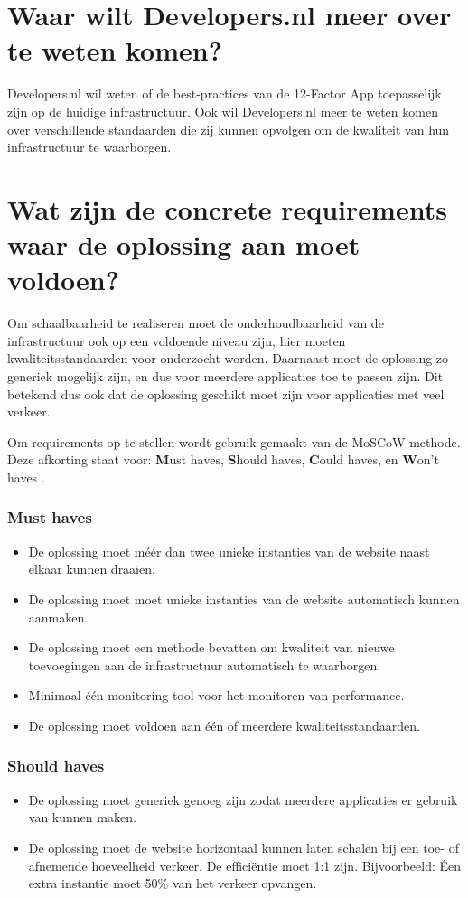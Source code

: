 \section{Waar wilt Developers.nl meer over te weten komen?}

Developers.nl wil weten of de best-practices van de 12-Factor App toepasselijk zijn op de huidige infrastructuur. Ook wil Developers.nl meer te weten komen over verschillende standaarden die zij kunnen opvolgen om de kwaliteit van hun infrastructuur te waarborgen.

\section{Wat zijn de concrete requirements waar de oplossing aan moet voldoen?}

Om schaalbaarheid te realiseren moet de onderhoudbaarheid van de infrastructuur ook op een voldoende niveau zijn, hier moeten kwaliteitsstandaarden voor onderzocht worden. Daarnaast moet de oplossing zo generiek mogelijk zijn, en dus voor meerdere applicaties toe te passen zijn. Dit betekend dus ook dat de oplossing geschikt moet zijn voor applicaties met veel verkeer.

Om requirements op te stellen wordt gebruik gemaakt van de MoSCoW-methode. Deze afkorting staat voor: \textbf{M}ust haves, \textbf{S}hould haves, \textbf{C}ould haves, en \textbf{W}on't haves \parencite{Moscow}.

\subsubsection{Must haves}
\begin{itemize}
	\item De oplossing moet méér dan twee unieke instanties van de website naast elkaar kunnen draaien.
	\item De oplossing moet moet unieke instanties van de website automatisch kunnen aanmaken.
	\item De oplossing moet een methode bevatten om kwaliteit van nieuwe toevoegingen aan de infrastructuur automatisch te waarborgen.
	\item Minimaal één monitoring tool voor het monitoren van performance.
	\item De oplossing moet voldoen aan één of meerdere kwaliteitsstandaarden.
\end{itemize}

\subsubsection{Should haves}
\begin{itemize}
	\item De oplossing moet generiek genoeg zijn zodat meerdere applicaties er gebruik van kunnen maken.
	\item De oplossing moet de website horizontaal kunnen laten schalen bij een toe- of afnemende hoeveelheid verkeer. De efficiëntie moet 1:1 zijn. Bijvoorbeeld: Éen extra instantie moet 50\% van het verkeer opvangen.
\end{itemize}

